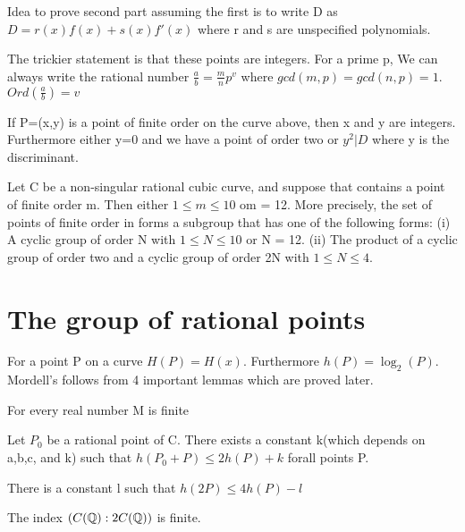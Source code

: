 \documentclass{article}
\begin{document}
Idea to prove second part assuming the first is to write D as $D = r(x) f(x) + s(x) f'(x)$ where r and s are unspecified polynomials. 

The trickier statement is that these points are integers. For a prime p, We can always write the rational number $\frac{a}{b} = \frac{m}{n}p^v$ where $gcd(m,p) = gcd(n,p) = 1$. $Ord(\frac{a}{b}) = v$

\begin{theorem}
     If P=(x,y) is a point of finite order on the curve above, then x and y are integers. Furthermore either y=0 and we have a point of order two or $y^2 | D$ where y is the discriminant. 
\end{theorem}

\begin{theorem}[Mazur]
     Let C be a non-singular rational cubic curve, and suppose that  contains a point of finite order m. Then either $1 \leq m \leq 10$ om = 12.
More precisely, the set of points of finite order in  forms a subgroup that
has one of the following forms:
(i) A cyclic group of order N with $1 \leq N \leq 10$ or N = 12.
(ii) The product of a cyclic group of order two and a cyclic group of order 2N
with $1 \leq N \leq 4$.
\end{theorem}

\section{The group of rational points}
For a point P on a curve $H(P) = H(x)$. Furthermore $h(P) = \log_2 (P)$. Mordell's follows from 4 important lemmas which are proved later.

\begin{lem}
For every real number M  is finite
\end{lem}

\begin{lem}
Let $P_0$ be a rational point of C. There exists a constant k(which depends on a,b,c, and k) such that $h(P_0 + P) \leq 2 h(P) + k$ forall points P.
\end{lem}

\begin{lem}
There is a constant l such that $h(2P) \leq 4h(P) - l$
\end{lem}

\begin{lem}
The index $(C(\mathbb{Q}) : 2C(\mathbb{Q}) )$ is finite.
\end{lem}
\end{document}
